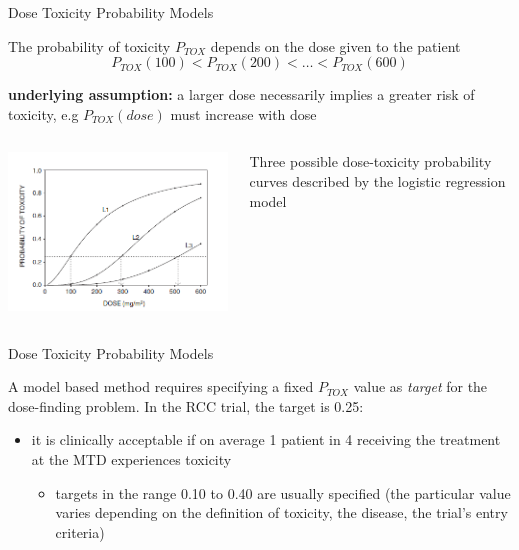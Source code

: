 \documentclass{beamer}
\begin{document}
\begin{frame}{Dose Toxicity Probability Models}

The probability of toxicity \(P_{TOX}\) depends on the dose given to the
patient \[
P_{TOX}(100) < P_{TOX}(200) < \ldots < P_{TOX}(600)
\]

\textbf{underlying assumption:} a larger dose necessarily implies a
greater risk of toxicity, e.g \(P_{TOX}(dose)\) must increase with dose

\begin{columns}
\begin{column}{6cm}

\begin{center}\includegraphics[scale=0.5]{images/BLR.png} \end{center}
\end{column}

\begin{column}{6cm}
Three possible dose-toxicity probability curves described by the
logistic regression model

\end{column}


\end{columns}

\end{frame}

\begin{frame}{Dose Toxicity Probability Models}

A model based method requires specifying a fixed \(P_{TOX}\) value as
\emph{target} for the dose-finding problem. In the RCC trial, the target
is 0.25:

\begin{itemize}
\itemsep1pt\parskip0pt
\item
  it is clinically acceptable if on average 1 patient in 4 receiving the
  treatment at the MTD experiences toxicity

  \begin{itemize}
  \itemsep1pt\parskip0pt
  \item
    targets in the range 0.10 to 0.40 are usually specified (the
    particular value varies depending on the definition of toxicity, the
    disease, the trial's entry criteria)
  \end{itemize}
\end{itemize}

\end{frame}
\end{document}
